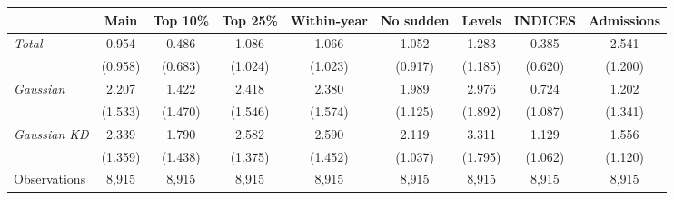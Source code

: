 \begin{tabular}{l*{8}{c}}
\toprule
 & Main & Top 10\% & Top 25\% & Within-year & No sudden & Levels & INDICES & Admissions \\
\midrule
\textit{Total} &  0.954 &  0.486 &  1.086 &  1.066 &  1.052 &  1.283 &  0.385 &  2.541\sym{**} \\
 & (0.958) & (0.683) & (1.024) & (1.023) & (0.917) & (1.185) & (0.620) & (1.200) \\
\addlinespace
\textit{Gaussian} &  2.207 &  1.422 &  2.418 &  2.380 &  1.989\sym{*} &  2.976 &  0.724 &  1.202 \\
 & (1.533) & (1.470) & (1.546) & (1.574) & (1.125) & (1.892) & (1.087) & (1.341) \\
\addlinespace
\textit{Gaussian KD} &  2.339\sym{*} &  1.790 &  2.582\sym{*} &  2.590\sym{*} &  2.119\sym{**} &  3.311\sym{*} &  1.129 &  1.556 \\
 & (1.359) & (1.438) & (1.375) & (1.452) & (1.037) & (1.795) & (1.062) & (1.120) \\
\midrule
Observations &     8,915 &     8,915 &     8,915 &     8,915 &     8,915 &     8,915 &     8,915 &     8,915 \\
\bottomrule
\end{tabular}
